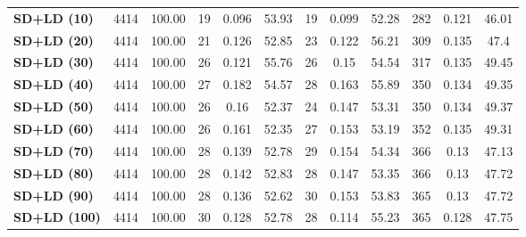 \documentclass{ieeeaccess}
\begin{document}
\begin{table}[htbp]
\begin{tabular}{|l|c|c|ccc|ccc|ccc|}
\hline
\textbf{SD+LD (10)} & 4414 & 100.00 & 19 & 0.096 & 53.93 & 19 & 0.099 & 52.28 & 282 & 0.121 & 46.01 \\
\textbf{SD+LD (20)} & 4414 & 100.00 & 21 & 0.126 & 52.85 & 23 & 0.122 & 56.21 & 309 & \cellcolor[HTML]{fef9e4}0.135 & 47.4 \\
\textbf{SD+LD (30)} & 4414 & 100.00 & 26 & 0.121 & 55.76 & 26 & 0.15 & 54.54 & 317 & 0.135 & \cellcolor[HTML]{fef9e4}49.45 \\
\textbf{SD+LD (40)} & 4414 & 100.00 & 27 & \cellcolor[HTML]{fef9e4}0.182 & \cellcolor[HTML]{fef9e4}54.57 & 28 & \cellcolor[HTML]{fef9e4}0.163 & \cellcolor[HTML]{fef9e4}55.89 & 350 & 0.134 & 49.35 \\
\textbf{SD+LD (50)} & 4414 & 100.00 & 26 & 0.16 & 52.37 & 24 & 0.147 & 53.31 & 350 & 0.134 & 49.37 \\
\textbf{SD+LD (60)} & 4414 & 100.00 & 26 & 0.161 & 52.35 & 27 & 0.153 & 53.19 & 352 & 0.135 & 49.31 \\
\textbf{SD+LD (70)} & 4414 & 100.00 & 28 & 0.139 & 52.78 & 29 & 0.154 & 54.34 & 366 & 0.13 & 47.13 \\
\textbf{SD+LD (80)} & 4414 & 100.00 & 28 & 0.142 & 52.83 & 28 & 0.147 & 53.35 & 366 & 0.13 & 47.72 \\
\textbf{SD+LD (90)} & 4414 & 100.00 & 28 & 0.136 & 52.62 & 30 & 0.153 & 53.83 & 365 & 0.13 & 47.72 \\
\textbf{SD+LD (100)} & 4414 & 100.00 & 30 & 0.128 & 52.78 & 28 & 0.114 & 55.23 & 365 & 0.128 & 47.75 \\
\hline
\end{tabular}
\end{table}
\end{document}
